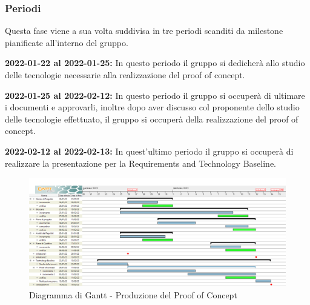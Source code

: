 \subsubsection{Periodi}

Questa fase viene a sua volta suddivisa in tre periodi scanditi da milestone pianificate all'interno del gruppo.

\textbf{2022-01-22 al 2022-01-25:} In questo periodo il gruppo si dedicherà allo studio delle tecnologie necessarie alla realizzazione del proof of concept.

\textbf{2022-01-25 al 2022-02-12:} In questo periodo il gruppo si occuperà di ultimare i documenti e approvarli, inoltre dopo aver discusso col proponente dello studio delle tecnologie effettuato, il gruppo si occuperà della realizzazione del proof of concept.

\textbf{2022-02-12 al 2022-02-13:} In quest'ultimo periodo il gruppo si occuperà di realizzare la presentazione per la Requirements and Technology Baseline.


\begin{figure}[H]
    \centering
    \includegraphics[scale=0.30]{Sezioni/gantt/TB.png}
    \caption{Diagramma di Gantt - Produzione del Proof of Concept}
\end{figure}